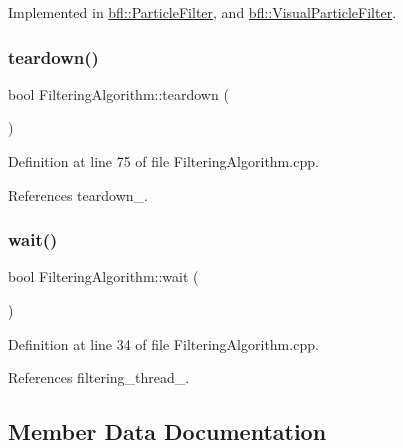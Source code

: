 Implemented in \mbox{\hyperlink{classbfl_1_1ParticleFilter_a2d7a5e7aaad179037273d35be229056d}{bfl\+::\+Particle\+Filter}}, and \mbox{\hyperlink{classbfl_1_1VisualParticleFilter_aab68e455c645bc1b7b8c3c2b476c2f9c}{bfl\+::\+Visual\+Particle\+Filter}}.

\mbox{\label{classbfl_1_1FilteringAlgorithm_a1dc912d89ee8f96d4f3e8209865c5308}} 
\subsubsection{\texorpdfstring{teardown()}{teardown()}}
{\footnotesize\ttfamily bool Filtering\+Algorithm\+::teardown (\begin{DoxyParamCaption}{ }\end{DoxyParamCaption})}



Definition at line 75 of file Filtering\+Algorithm.\+cpp.



References teardown\+\_\+.

\mbox{\label{classbfl_1_1FilteringAlgorithm_a40372c24fa050eb0274371172df0a244}} 
\subsubsection{\texorpdfstring{wait()}{wait()}}
{\footnotesize\ttfamily bool Filtering\+Algorithm\+::wait (\begin{DoxyParamCaption}{ }\end{DoxyParamCaption})}



Definition at line 34 of file Filtering\+Algorithm.\+cpp.



References filtering\+\_\+thread\+\_\+.



\subsection{Member Data Documentation}
\mbox{\label{classbfl_1_1FilteringAlgorithm_ae92a6d82ce18c35516f42a7109c931af}} 
